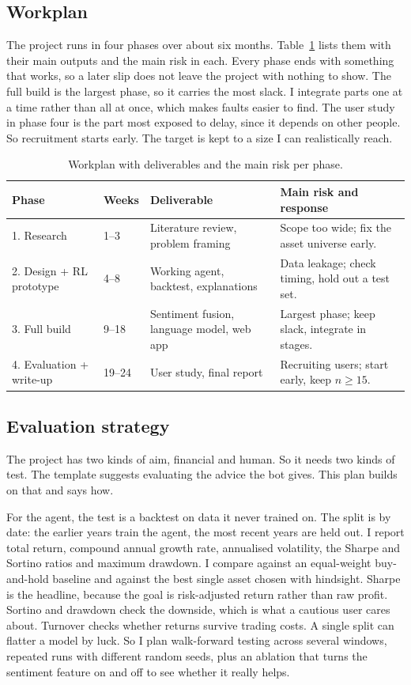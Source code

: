 \documentclass[12pt,twoside,letterpaper]{article}
\begin{document}
\subsection{Workplan}

The project runs in four phases over about six months. Table~\ref{tab:plan} lists
them with their main outputs and the main risk in each. Every phase ends with
something that works, so a later slip does not leave the project with nothing to
show. The full build is the largest phase, so it carries the most slack. I integrate
parts one at a time rather than all at once, which makes faults easier to find. The
user study in phase four is the part most exposed to delay, since it depends on
other people. So recruitment starts early. The target is kept to a size I can
realistically reach.

\begin{table}[H]
\centering
\caption{Workplan with deliverables and the main risk per phase.}
\label{tab:plan}
\begin{tabular}{p{2.4cm} p{1.6cm} p{4.0cm} p{4.0cm}}
\toprule
Phase & Weeks & Deliverable & Main risk and response \\
\midrule
1. Research & 1--3 & Literature review, problem framing & Scope too wide; fix the asset universe early. \\
2. Design + RL prototype & 4--8 & Working agent, backtest, explanations & Data leakage; check timing, hold out a test set. \\
3. Full build & 9--18 & Sentiment fusion, language model, web app & Largest phase; keep slack, integrate in stages. \\
4. Evaluation + write-up & 19--24 & User study, final report & Recruiting users; start early, keep $n \geq 15$. \\
\bottomrule
\end{tabular}
\end{table}

\subsection{Evaluation strategy}

The project has two kinds of aim, financial and human. So it needs two kinds of
test. The template suggests evaluating the advice the bot gives. This plan builds on
that and says how.

For the agent, the test is a backtest on data it never trained on. The split is by
date: the earlier years train the agent, the most recent years are held out. I
report total return, compound annual growth rate, annualised volatility, the Sharpe
\cite{sharpe1966} and Sortino \cite{sortino1994} ratios and maximum drawdown. I
compare against an equal-weight buy-and-hold baseline and against the best single
asset chosen with hindsight. Sharpe is the headline, because the goal is
risk-adjusted return rather than raw profit. Sortino and drawdown check the
downside, which is what a cautious user cares about. Turnover checks whether returns
survive trading costs. A single split can flatter a model by luck. So I plan
walk-forward testing across several windows, repeated runs with different random
seeds, plus an ablation that turns the sentiment feature on and off to see whether it
really helps.
\end{document}
